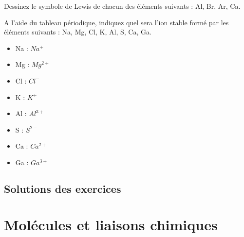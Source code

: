 \documentclass[
  11pt,
  a4paper,
  openany]{book}
\providecommand{\tightlist}{%
  \setlength{\itemsep}{0pt}\setlength{\parskip}{0pt}}
\begin{document}
\begin{Exercise}

Dessinez le symbole de Lewis de chacun des éléments suivants : Al, Br, Ar, Ca.


\end{Exercise}

\begin{Exercise}

A l'aide du tableau périodique, indiquez quel sera l'ion stable formé par les éléments suivants : Na, Mg, Cl, K, Al, S, Ca, Ga.


\end{Exercise}

\begin{Answer}

\begin{itemize}
\tightlist
\item
  Na : \(Na^+\)
\item
  Mg : \(Mg^{2+}\)
\item
  Cl : \(Cl^-\)
\item
  K : \(K^+\)
\item
  Al : \(Al^{3+}\)
\item
  S : \(S^{2-}\)
\item
  Ca : \(Ca^{2+}\)
\item
  Ga : \(Ga^{3+}\)
\end{itemize}

\end{Answer}

\newpage

\section{Solutions des exercices} \shipoutAnswer

\chapter{Molécules et liaisons chimiques}\label{moluxe9cules-et-liaisons-chimiques}
\end{document}
